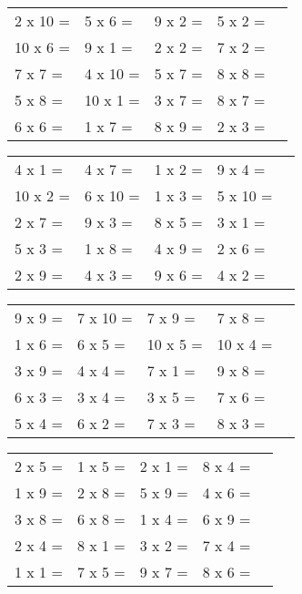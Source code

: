 
\begin{table}[ht] 
\begin{tabular}{ M{3cm} M{3.5cm} M{3,5cm} M{3.5cm} N }
2 x 10 =    & 5 x 6 =   & 9 x 2 =    &   5 x 2 =        &\\[1em] 
10 x 6 =    & 9 x 1 =   & 2 x 2 =    &   7 x 2 =        &\\[1em] 
7 x 7 =    & 4 x 10 =   & 5 x 7 =    &   8 x 8 =        &\\[1em] 
5 x 8 =    & 10 x 1 =   & 3 x 7 =    &   8 x 7 =        &\\[1em] 
6 x 6 =    & 1 x 7 =   & 8 x 9 =    &   2 x 3 =        &\\[1em] 
\end{tabular}\end{table} 

\begin{table}[ht] 
\begin{tabular}{ M{3cm} M{3.5cm} M{3,5cm} M{3.5cm} N }
4 x 1 =    & 4 x 7 =   & 1 x 2 =    &   9 x 4 =        &\\[1em] 
10 x 2 =    & 6 x 10 =   & 1 x 3 =    &   5 x 10 =        &\\[1em] 
2 x 7 =    & 9 x 3 =   & 8 x 5 =    &   3 x 1 =        &\\[1em] 
5 x 3 =    & 1 x 8 =   & 4 x 9 =    &   2 x 6 =        &\\[1em] 
2 x 9 =    & 4 x 3 =   & 9 x 6 =    &   4 x 2 =        &\\[1em] 
\end{tabular}\end{table} 

\begin{table}[ht] 
\begin{tabular}{ M{3cm} M{3.5cm} M{3,5cm} M{3.5cm} N }
9 x 9 =    & 7 x 10 =   & 7 x 9 =    &   7 x 8 =        &\\[1em] 
1 x 6 =    & 6 x 5 =   & 10 x 5 =    &   10 x 4 =        &\\[1em] 
3 x 9 =    & 4 x 4 =   & 7 x 1 =    &   9 x 8 =        &\\[1em] 
6 x 3 =    & 3 x 4 =   & 3 x 5 =    &   7 x 6 =        &\\[1em] 
5 x 4 =    & 6 x 2 =   & 7 x 3 =    &   8 x 3 =        &\\[1em] 
\end{tabular}\end{table} 

\begin{table}[ht] 
\begin{tabular}{ M{3cm} M{3.5cm} M{3,5cm} M{3.5cm} N }
2 x 5 =    & 1 x 5 =   & 2 x 1 =    &   8 x 4 =        &\\[1em] 
1 x 9 =    & 2 x 8 =   & 5 x 9 =    &   4 x 6 =        &\\[1em] 
3 x 8 =    & 6 x 8 =   & 1 x 4 =    &   6 x 9 =        &\\[1em] 
2 x 4 =    & 8 x 1 =   & 3 x 2 =    &   7 x 4 =        &\\[1em] 
1 x 1 =    & 7 x 5 =   & 9 x 7 =    &   8 x 6 =        &\\[1em] 
\end{tabular}\end{table} 

